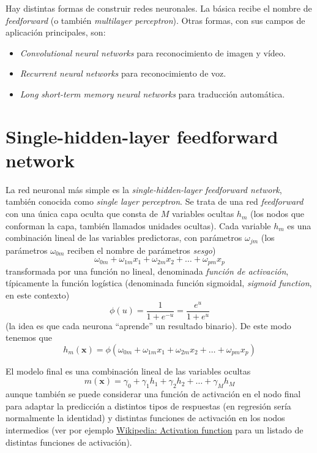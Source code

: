\documentclass[
]{book}
\theoremstyle{break}
\theoremstyle{definition}
\theoremstyle{definition}
\theoremstyle{definition}
\theoremstyle{definition}
\theoremstyle{remark}
\begin{document}
Hay distintas formas de construir redes neuronales. La básica recibe el nombre de \emph{feedforward} (o también \emph{multilayer perceptron}). Otras formas, con sus campos de aplicación principales, son:

\begin{itemize}
\item
  \emph{Convolutional neural networks} para reconocimiento de imagen y vídeo.
\item
  \emph{Recurrent neural networks} para reconocimiento de voz.
\item
  \emph{Long short-term memory neural networks} para traducción automática.
\end{itemize}

\hypertarget{single-hidden-layer-feedforward-network}{%
\section{Single-hidden-layer feedforward network}\label{single-hidden-layer-feedforward-network}}

La red neuronal más simple es la \emph{single-hidden-layer feedforward network}, también conocida como \emph{single layer perceptron}. Se trata de una red \emph{feedforward} con una única capa oculta que consta de \(M\) variables ocultas \(h_m\) (los nodos que conforman la capa, también llamados unidades ocultas). Cada variable \(h_m\) es una combinación lineal de las variables predictoras, con parámetros \(\omega_{jm}\) (los parámetros \(\omega_{0m}\) reciben el nombre de parámetros \emph{sesgo})
\[\omega_{0m} + \omega_{1m} x_1 + \omega_{2m} x_2 + \ldots + \omega_{pm} x_p\]
transformada por una función no lineal, denominada \emph{función de activación}, típicamente la función logística (denominada función sigmoidal, \emph{sigmoid function}, en este contexto)
\[\phi(u) = \frac{1}{1 + e^{-u}} = \frac{e^u}{1 + e^u}\]
(la idea es que cada neurona ``aprende'' un resultado binario).
De este modo tenemos que
\[h_{m}(\mathbf{x}) = \phi\left( \omega_{0m} + \omega_{1m} x_1 + \omega_{2m} x_2 + \ldots + \omega_{pm} x_p \right)\]

El modelo final es una combinación lineal de las variables ocultas
\[m(\mathbf{x}) = \gamma_0 + \gamma_1 h_1 + \gamma_2 h_2 + \ldots + \gamma_M h_M\]
aunque también se puede considerar una función de activación en el nodo final para adaptar la predicción a distintos tipos de respuestas (en regresión sería normalmente la identidad) y distintas funciones de activación en los nodos intermedios (ver por ejemplo \href{https://en.wikipedia.org/wiki/Activation_function}{Wikipedia: Activation function} para un listado de distintas funciones de activación).
\end{document}
